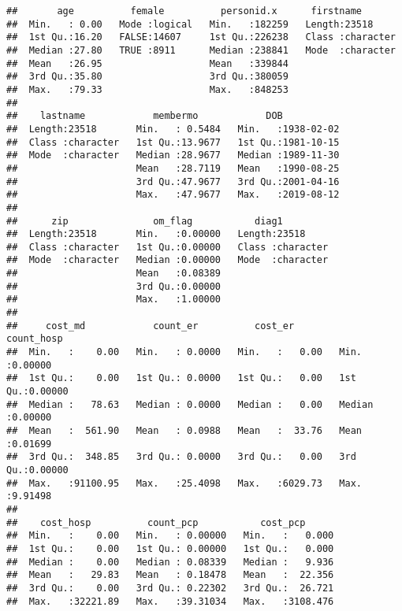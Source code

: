 \documentclass[]{article}
\begin{document}
\begin{verbatim}
##       age          female          personid.x      firstname        
##  Min.   : 0.00   Mode :logical   Min.   :182259   Length:23518      
##  1st Qu.:16.20   FALSE:14607     1st Qu.:226238   Class :character  
##  Median :27.80   TRUE :8911      Median :238841   Mode  :character  
##  Mean   :26.95                   Mean   :339844                     
##  3rd Qu.:35.80                   3rd Qu.:380059                     
##  Max.   :79.33                   Max.   :848253                     
##                                                                     
##    lastname            membermo            DOB            
##  Length:23518       Min.   : 0.5484   Min.   :1938-02-02  
##  Class :character   1st Qu.:13.9677   1st Qu.:1981-10-15  
##  Mode  :character   Median :28.9677   Median :1989-11-30  
##                     Mean   :28.7119   Mean   :1990-08-25  
##                     3rd Qu.:47.9677   3rd Qu.:2001-04-16  
##                     Max.   :47.9677   Max.   :2019-08-12  
##                                                           
##      zip               om_flag           diag1          
##  Length:23518       Min.   :0.00000   Length:23518      
##  Class :character   1st Qu.:0.00000   Class :character  
##  Mode  :character   Median :0.00000   Mode  :character  
##                     Mean   :0.08389                     
##                     3rd Qu.:0.00000                     
##                     Max.   :1.00000                     
##                                                         
##     cost_md            count_er          cost_er          count_hosp     
##  Min.   :    0.00   Min.   : 0.0000   Min.   :   0.00   Min.   :0.00000  
##  1st Qu.:    0.00   1st Qu.: 0.0000   1st Qu.:   0.00   1st Qu.:0.00000  
##  Median :   78.63   Median : 0.0000   Median :   0.00   Median :0.00000  
##  Mean   :  561.90   Mean   : 0.0988   Mean   :  33.76   Mean   :0.01699  
##  3rd Qu.:  348.85   3rd Qu.: 0.0000   3rd Qu.:   0.00   3rd Qu.:0.00000  
##  Max.   :91100.95   Max.   :25.4098   Max.   :6029.73   Max.   :9.91498  
##                                                                          
##    cost_hosp          count_pcp           cost_pcp       
##  Min.   :    0.00   Min.   : 0.00000   Min.   :   0.000  
##  1st Qu.:    0.00   1st Qu.: 0.00000   1st Qu.:   0.000  
##  Median :    0.00   Median : 0.08339   Median :   9.936  
##  Mean   :   29.83   Mean   : 0.18478   Mean   :  22.356  
##  3rd Qu.:    0.00   3rd Qu.: 0.22302   3rd Qu.:  26.721  
##  Max.   :32221.89   Max.   :39.31034   Max.   :3108.476  

\end{verbatim}
\end{document}
